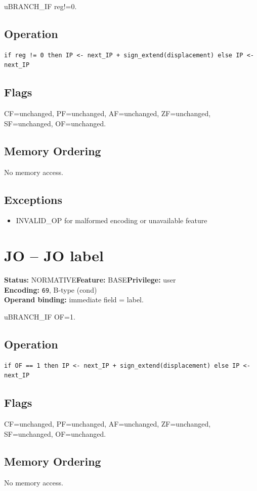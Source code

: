 \documentclass[10pt]{article}
\begin{document}
uBRANCH\_IF reg!=0.

\subsection*{Operation}
\begin{lstlisting}
if reg != 0 then IP <- next_IP + sign_extend(displacement) else IP <- next_IP
\end{lstlisting}
\subsection*{Flags}
CF=unchanged, PF=unchanged, AF=unchanged, ZF=unchanged, SF=unchanged, OF=unchanged.
\subsection*{Memory Ordering}
No memory access.
\subsection*{Exceptions}
\begin{itemize}
\item INVALID\_OP for malformed encoding or unavailable feature
\end{itemize}
\clearpage

\section{JO -- JO label}
\textbf{Status:} NORMATIVE\quad \textbf{Feature:} BASE\quad \textbf{Privilege:} user\\
\textbf{Encoding:} \texttt{69}, B-type (cond)\\
\textbf{Operand binding:} immediate field = label.

uBRANCH\_IF OF=1.

\subsection*{Operation}
\begin{lstlisting}
if OF == 1 then IP <- next_IP + sign_extend(displacement) else IP <- next_IP
\end{lstlisting}
\subsection*{Flags}
CF=unchanged, PF=unchanged, AF=unchanged, ZF=unchanged, SF=unchanged, OF=unchanged.
\subsection*{Memory Ordering}
No memory access.
\end{document}

